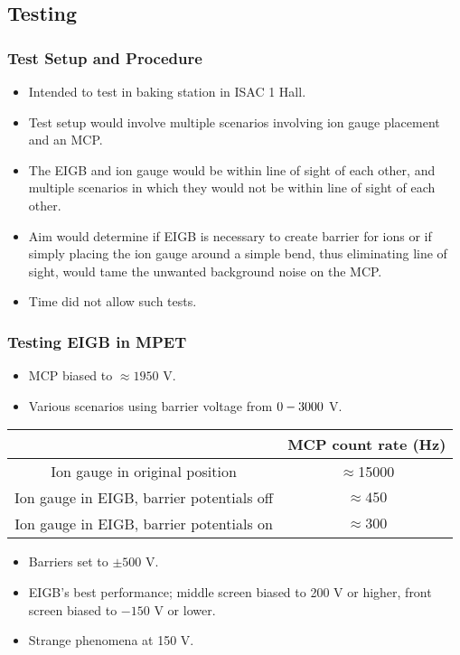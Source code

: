 \documentclass{beamer}
\begin{document}
\subsection{Testing}
\frame
{
  \frametitle{Test Setup and Procedure}
  \begin{itemize}
  \item<1> Intended to test in baking station in ISAC 1 Hall.
  \item<1> Test setup would involve multiple scenarios involving ion gauge placement and an MCP. 
  \item<1> The EIGB and ion gauge would be within line of sight of each other, and multiple scenarios in which they would not be within line of sight of each other.
  \item<1>Aim would determine if EIGB is necessary to create barrier for ions or if simply placing the ion gauge around a simple bend, thus eliminating line of sight, would tame the unwanted background noise on the MCP.
  \item<1> Time did not allow such tests.
  \end{itemize}
}
\frame
{
  \frametitle{Testing EIGB in MPET}
  \begin{itemize}
  \item<1>MCP biased to $\approx 1950$ V.
  \item<1>Various scenarios using barrier voltage from $0\--3000$ V.
  \end{itemize}
  \begin{table}[htdp]
\begin{tabular}{|c|c|}
\hline
&MCP count rate (Hz)\\
\hline
Ion gauge in original position&$\approx$15000\\
Ion gauge in EIGB, barrier potentials off&$\approx450$\\
Ion gauge in EIGB, barrier potentials on&$\approx300$\\
\hline
\end{tabular}
\end{table}%
\begin{itemize}
\item<1>Barriers set to $\pm500$ V.
\item<1>EIGB's best performance; middle screen biased to 200 V or higher, front screen biased to $-150$ V or lower.
\item<1>Strange phenomena at 150 V.
\end{itemize}
}
\frame
\end{document}

